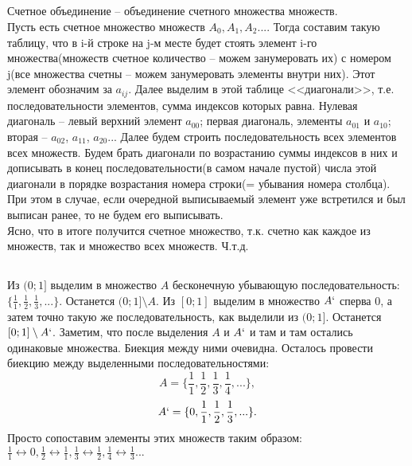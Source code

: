 \subsection{}
Счетное объединение -- объединение счетного множества множеств.\\
Пусть есть счетное множество множеств $A_0, A_1, A_2 ... $. Тогда составим такую таблицу, что в i-й строке на j-м месте будет стоять элемент i-го множества(множеств счетное количество -- можем занумеровать их) с номером j(все множества счетны -- можем занумеровать элементы внутри них). Этот элемент обозначим за $a_{ij}$. Далее выделим в этой таблице <<диагонали>>, т.е. последовательности элементов, сумма индексов которых равна. Нулевая диагональ -- левый верхний элемент $a_{00}$; первая диагональ, элементы $a_{01}$ и $a_{10}$; вторая -- $a_{02}$, $a_{11}$, $a_{20}$... Далее будем строить последовательность всех элементов всех множеств. Будем брать диагонали по возрастанию суммы индексов в них и дописывать в конец последовательности(в самом начале пустой) числа этой диагонали в порядке возрастания номера строки(= убывания номера столбца). При этом в случае, если очередной выписываемый элемент уже встретился и был выписан ранее, то не будем его выписывать.\\
Ясно, что в итоге получится счетное множество, т.к. счетно как каждое из множеств, так и множество всех множеств. Ч.т.д.
\subsection{}
Из $(0;1]$ выделим в множество $A$ бесконечную убывающую последовательность: $\{\frac{1}{1}, \frac{1}{2},\frac{1}{3}, ...\}$. Останется $(0;1]\setminus A$. Из $[0;1]$ выделим в множество $A`$ сперва 0, а затем точно такую же последовательность, как выделили из $(0;1]$. Останется $[0;1]\setminus A`$. Заметим, что после выделения $A$ и $A`$ и там и там остались одинаковые множества. Биекция между ними очевидна. Осталось провести биекцию между выделенными последовательностями:
$$A = \{\frac{1}{1}, \frac{1}{2}, \frac{1}{3}, \frac{1}{4}, ...\},$$
$$A` = \{0, \frac{1}{1}, \frac{1}{2}, \frac{1}{3}, ...\}.$$
Просто сопоставим элементы этих множеств таким образом: $\frac{1}{1}\leftrightarrow 0, \frac{1}{2}\leftrightarrow \frac{1}{1}, \frac{1}{3}\leftrightarrow \frac{1}{2}, \frac{1}{4}\leftrightarrow \frac{1}{3} ...$
\section{}
